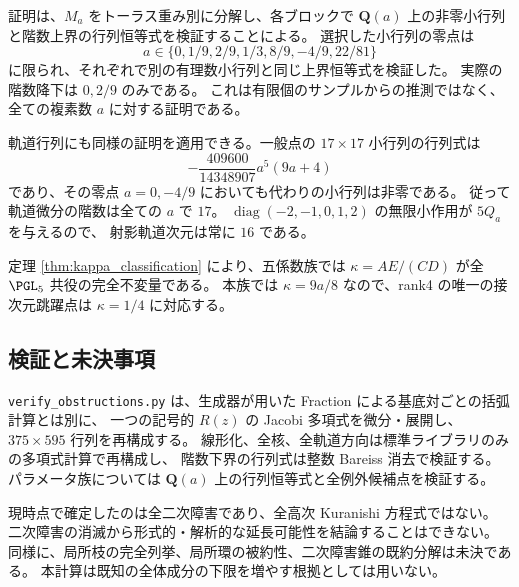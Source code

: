 証明は、$M_a$ をトーラス重み別に分解し、各ブロックで
$\mathbf Q(a)$ 上の非零小行列と階数上界の行列恒等式を検証することによる。
選択した小行列の零点は
\[
 a\in\{0,1/9,2/9,1/3,8/9,-4/9,22/81\}
\]
に限られ、それぞれで別の有理数小行列と同じ上界恒等式を検証した。
実際の階数降下は $0,2/9$ のみである。
これは有限個のサンプルからの推測ではなく、全ての複素数 $a$ に対する証明である。

軌道行列にも同様の証明を適用できる。一般点の $17\times17$ 小行列の行列式は
\[
 -\frac{409600}{14348907}a^5(9a+4)
\]
であり、その零点 $a=0,-4/9$ においても代わりの小行列は非零である。
従って軌道微分の階数は全ての $a$ で $17$。
$\operatorname{diag}(-2,-1,0,1,2)$ の無限小作用が $5Q_a$ を与えるので、
射影軌道次元は常に $16$ である。

定理 \ref{thm:kappa_classification} により、五係数族では
$\kappa=AE/(CD)$ が全 $\PGL_5$ 共役の完全不変量である。
本族では $\kappa=9a/8$ なので、rank4 の唯一の接次元跳躍点は
$\kappa=1/4$ に対応する。

\subsection{検証と未決事項}

\texttt{verify\_obstructions.py} は、生成器が用いた Fraction による基底対ごとの括弧計算とは別に、
一つの記号的 $R(z)$ の Jacobi 多項式を微分・展開し、$375\times595$ 行列を再構成する。
線形化、全核、全軌道方向は標準ライブラリのみの多項式計算で再構成し、
階数下界の行列式は整数 Bareiss 消去で検証する。
パラメータ族については $\mathbf Q(a)$ 上の行列恒等式と全例外候補点を検証する。

現時点で確定したのは全二次障害であり、全高次 Kuranishi 方程式ではない。
二次障害の消滅から形式的・解析的な延長可能性を結論することはできない。
同様に、局所枝の完全列挙、局所環の被約性、二次障害錐の既約分解は未決である。
本計算は既知の全体成分の下限を増やす根拠としては用いない。
